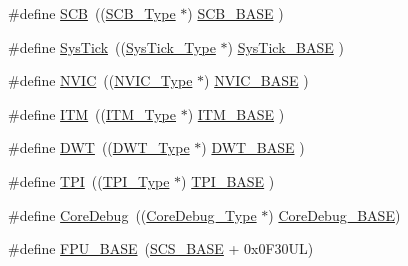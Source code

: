 \begin{DoxyCompactItemize}
\item 
\#define \hyperlink{group___c_m_s_i_s__core__base_gaaaf6477c2bde2f00f99e3c2fd1060b01}{S\+CB}~((\hyperlink{struct_s_c_b___type}{S\+C\+B\+\_\+\+Type}       $\ast$)     \hyperlink{group___c_m_s_i_s__core__base_gad55a7ddb8d4b2398b0c1cfec76c0d9fd}{S\+C\+B\+\_\+\+B\+A\+SE}      )
\item 
\#define \hyperlink{group___c_m_s_i_s__core__base_gacd96c53beeaff8f603fcda425eb295de}{Sys\+Tick}~((\hyperlink{struct_sys_tick___type}{Sys\+Tick\+\_\+\+Type}   $\ast$)     \hyperlink{group___c_m_s_i_s__core__base_ga58effaac0b93006b756d33209e814646}{Sys\+Tick\+\_\+\+B\+A\+SE}  )
\item 
\#define \hyperlink{group___c_m_s_i_s__core__base_gac8e97e8ce56ae9f57da1363a937f8a17}{N\+V\+IC}~((\hyperlink{struct_n_v_i_c___type}{N\+V\+I\+C\+\_\+\+Type}      $\ast$)     \hyperlink{group___c_m_s_i_s__core__base_gaa0288691785a5f868238e0468b39523d}{N\+V\+I\+C\+\_\+\+B\+A\+SE}     )
\item 
\#define \hyperlink{group___c_m_s_i_s__core__base_gabae7cdf882def602cb787bb039ff6a43}{I\+TM}~((\hyperlink{struct_i_t_m___type}{I\+T\+M\+\_\+\+Type}       $\ast$)     \hyperlink{group___c_m_s_i_s__core__base_gadd76251e412a195ec0a8f47227a8359e}{I\+T\+M\+\_\+\+B\+A\+SE}      )
\item 
\#define \hyperlink{group___c_m_s_i_s__core__base_gabbe5a060185e1d5afa3f85b14e10a6ce}{D\+WT}~((\hyperlink{struct_d_w_t___type}{D\+W\+T\+\_\+\+Type}       $\ast$)     \hyperlink{group___c_m_s_i_s__core__base_gafdab534f961bf8935eb456cb7700dcd2}{D\+W\+T\+\_\+\+B\+A\+SE}      )
\item 
\#define \hyperlink{group___c_m_s_i_s__core__base_ga8b4dd00016aed25a0ea54e9a9acd1239}{T\+PI}~((\hyperlink{struct_t_p_i___type}{T\+P\+I\+\_\+\+Type}       $\ast$)     \hyperlink{group___c_m_s_i_s__core__base_ga2b1eeff850a7e418844ca847145a1a68}{T\+P\+I\+\_\+\+B\+A\+SE}      )
\item 
\#define \hyperlink{group___c_m_s_i_s__core__base_gab6e30a2b802d9021619dbb0be7f5d63d}{Core\+Debug}~((\hyperlink{struct_core_debug___type}{Core\+Debug\+\_\+\+Type} $\ast$)     \hyperlink{group___c_m_s_i_s__core__base_ga680604dbcda9e9b31a1639fcffe5230b}{Core\+Debug\+\_\+\+B\+A\+SE})
\item 
\#define \hyperlink{group___c_m_s_i_s__core__base_ga4dcad4027118c098c07bcd575f1fbb28}{F\+P\+U\+\_\+\+B\+A\+SE}~(\hyperlink{group___c_m_s_i_s__core__base_ga3c14ed93192c8d9143322bbf77ebf770}{S\+C\+S\+\_\+\+B\+A\+SE} +  0x0\+F30\+U\+L)
\item 

\end{DoxyCompactItemize}
